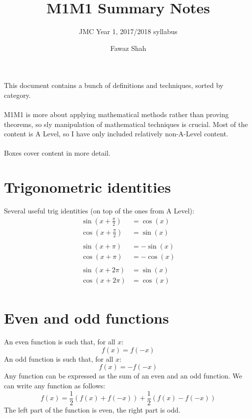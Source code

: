 \documentclass{scrartcl}
\title{M1M1 Summary Notes}
\subtitle{JMC Year 1, 2017/2018 syllabus}
\date{}
\author{Fawaz Shah}
\begin{document}
\large
\maketitle
\noindent This document contains a bunch of definitions and techniques, sorted by category.
\\\\
M1M1 is more about applying mathematical methods rather than proving theorems, so sly manipulation of mathematical techniques is crucial. Most of the content is A Level, so I have only included relatively non-A-Level content.
\\\\
Boxes cover content in more detail.
\tableofcontents
\newpage

\section{Trigonometric identities}
Several useful trig identities (on top of the ones from A Level):
\begin{align}
\sin(x + \frac{\pi}{2}) & = \cos(x) \\
\cos(x + \frac{\pi}{2}) & = \sin(x) \\
\\
\sin(x + \pi) & = - \sin(x) \\
\cos(x + \pi) & = - \cos(x) \\
\\
\sin(x + 2 \pi) & = \sin(x) \\
\cos(x + 2 \pi) & = \cos(x) \\
\end{align}

\section{Even and odd functions}
An even function is such that, for all $ x $:
\begin{equation}
f(x) = f(-x)
\end{equation}
An odd function is such that, for all $ x $:
\begin{equation}
f(x) = -f(-x)
\end{equation}
Any function can be expressed as the sum of an even and an odd function. We can write any function as follows:
\begin{equation}
f(x) = \frac{1}{2}(f(x) + f(-x)) + \frac{1}{2}(f(x) - f(-x))
\end{equation}
The left part of the function is even, the right part is odd.
\end{document}
